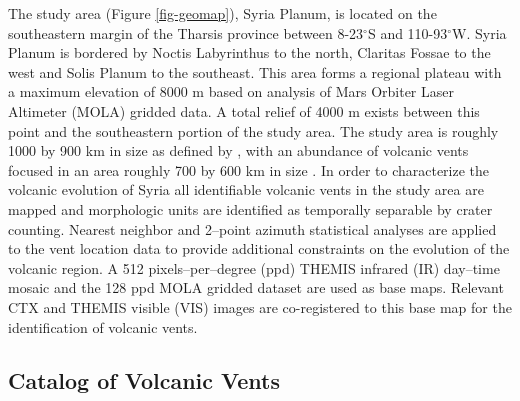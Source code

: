 The study area (Figure \ref{fig-geomap}), Syria Planum, is located on the southeastern margin of the Tharsis province between 8-23$^{\circ}$S and 110-93$^{\circ}$W. Syria Planum is bordered by Noctis Labyrinthus to the north, Claritas Fossae to the west and Solis Planum to the southeast. This area forms a regional plateau with a maximum elevation of 8000 m based on analysis of Mars Orbiter Laser Altimeter (MOLA) \citep{smith2003mars} gridded data. A total relief of 4000 m exists between this point and the southeastern portion of the study area. The study area is roughly 1000 by 900 km in size as defined by \citet{Scott1986}, with an abundance of volcanic vents focused in an area roughly 700 by 600 km in size \citep{Richardson2010,Richardson2012}. In order to characterize the volcanic evolution of Syria all identifiable volcanic vents in the study area are mapped and morphologic units are identified as temporally separable by crater counting. Nearest neighbor and 2--point azimuth statistical analyses are applied to the vent location data to provide additional constraints on the evolution of the volcanic region. A 512 pixels--per--degree (ppd) THEMIS infrared (IR) day--time mosaic \citep{Christensen2004} and the 128 ppd MOLA gridded dataset \citep{smith2003mars} are used as base maps. Relevant CTX \citep{malin2007context} and THEMIS visible (VIS) \citep{Christensen2004} images are co-registered to this base map for the identification of volcanic vents.

\subsection{Catalog of Volcanic Vents}

